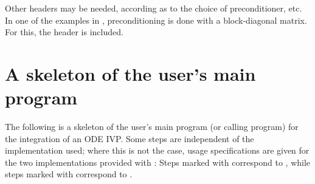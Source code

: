 Other headers may be needed, according as to the choice of preconditioner,
etc. In one of the examples in \cite{cvode2.4.0_ex}, preconditioning is done
with a block-diagonal matrix. For this, the header  is included.

\section{A skeleton of the user's main program}\label{ss:skeleton_sim}

The following is a skeleton of the user's main program (or calling
program) for the integration of an ODE IVP. Some steps are independent
of the {\nvector} implementation used; where this is not the case, usage
specifications are given for the two implementations provided with {\cvode}:
Steps marked with {\p} correspond to  {\nvecp}, while steps marked with
{\s} correspond to {\nvecs}.
